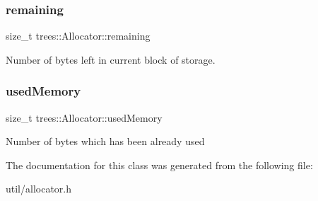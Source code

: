 \subsubsection{\texorpdfstring{remaining}{remaining}}
{\footnotesize\ttfamily size\+\_\+t trees\+::\+Allocator\+::remaining\hspace{0.3cm}{\ttfamily [protected]}}

Number of bytes left in current block of storage. \mbox{\label{classtrees_1_1_allocator_a9a6f444512dd3e66121a821e114207dd}} 
\subsubsection{\texorpdfstring{used\+Memory}{usedMemory}}
{\footnotesize\ttfamily size\+\_\+t trees\+::\+Allocator\+::used\+Memory\hspace{0.3cm}{\ttfamily [protected]}}

Number of bytes which has been already used 

The documentation for this class was generated from the following file\+:\begin{DoxyCompactItemize}
\item 
util/allocator.\+h\end{DoxyCompactItemize}
